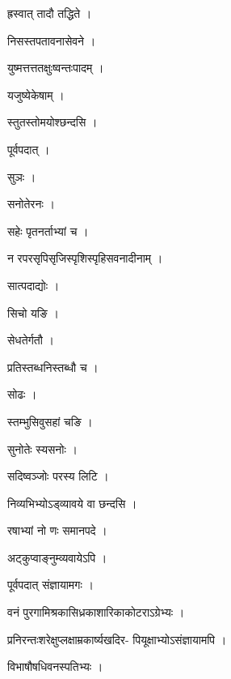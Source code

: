 \documentclass[10pt, openany]{book}
\begin{document}
\noindent ह्रस्वात् तादौ तद्धिते ।

\noindent निसस्तपतावनासेवने ।

\noindent युष्मत्तत्ततक्षुःष्वन्तःपादम् ।

\noindent यजुष्येकेषाम् ।

\noindent स्तुतस्तोमयोश्छन्दसि ।

\noindent पूर्वपदात् ।

\noindent सुञः ।

\noindent सनोतेरनः ।

\noindent सहेः पृतनर्ताभ्यां च ।

\noindent न रपरसृपिसृजिस्पृशिस्पृहिसवनादीनाम् ।

\noindent सात्पदाद्योः ।

\noindent सिचो यङि ।

\noindent सेधतेर्गतौ ।

\noindent प्रतिस्तब्धनिस्तब्धौ च ।

\noindent सोढः ।

\noindent स्तम्भुसिवुसहां चङि ।

\noindent सुनोतेः स्यसनोः ।

\noindent सदिष्वञ्जोः परस्य लिटि ।

\noindent निव्यभिभ्योऽड्व्यावये वा छन्दसि ।

\noindent रषाभ्यां नो णः समानपदे ।

\noindent अट्कुप्वाङ्नुम्व्यवायेऽपि ।

\noindent पूर्वपदात् संज्ञायामगः ।

\noindent वनं पुरगामिश्रकासिध्रकाशारिकाकोटराऽग्रेभ्यः ।

\noindent प्रनिरन्तःशरेक्षुप्लक्षाम्रकार्ष्यखदिर- पियूक्षाभ्योऽसंज्ञायामपि ।

\noindent विभाषौषधिवनस्पतिभ्यः ।
\end{document}
